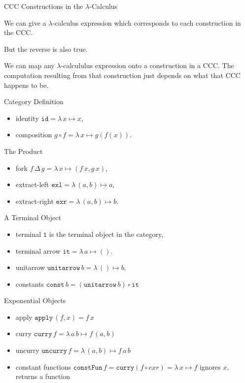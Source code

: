\documentclass[10pt]{beamer}
\newcommand{\id}{\mathtt{id}}
\newcommand{\apply}{\mathtt{apply}}
\newcommand{\curry}{\mathtt{curry}}
\newcommand{\uncurry}{\mathtt{uncurry}}
\newcommand{\exl}{\mathtt{exl}}
\newcommand{\exr}{\mathtt{exr}}
\newcommand{\termin}{\mathtt{1}}
\newcommand{\termarr}{\mathtt{it}}
\newcommand{\unitarrow}{\ensuremath{\mathtt{unitarrow}}}
\newcommand{\lamf}[2]{\ensuremath{\lambda\, #1 \mapsto #2}}
\newcommand{\delprod}[2]{\ensuremath{#1\,\Delta\,#2}}
\newcommand{\const}{\ensuremath{\mathtt{const}}}
\newcommand{\constFun}{\ensuremath{\mathtt{constFun}}}
\theoremstyle{definition}
\theoremstyle{remark}
\numberwithin{equation}{section}
\begin{document}
\begin{frame}[fragile]{CCC Constructions in the $\lambda$-Calculus}

  We can give a $\lambda$-calculus expression which corresponds to each construction in the CCC.

  But the reverse is also true.

  We can map any $\lambda$-calcululus expression onto a construction in a CCC. The computation resulting from that construction just depends on what that CCC happens to be.
  
\end{frame}

\begin{frame}[fragile]{Category Definition}
  \begin{itemize}
  \item identity $\id = \lamf{x}{x} $,
  \item composition $g \circ f = \lamf{x}{g(f(x))}$.
  \end{itemize}
\end{frame}

\begin{frame}[fragile]{The Product}
  \begin{itemize}
  \item fork $\delprod{f}{g} = \lamf{x}{(f\,x,g\,x)}$,
  \item extract-left $\exl = \lamf{(a,b)}{a}$,
  \item extract-right $\exr = \lamf{(a,b)}{b}$.
  \end{itemize}
\end{frame}

\begin{frame}[fragile]{A Terminal Object}
  \begin{itemize}
  \item terminal $\termin$ is the terminal object in the category,
  \item terminal arrow $\termarr = \lamf{a}{()}$.
  \item unitarrow $\unitarrow\, b = \lamf{()}{b}$.
  \item constants $\const\, b = (\unitarrow\, b) \circ \termarr$
  \end{itemize}
\end{frame}

\begin{frame}[fragile]{Exponential Objects}
  \begin{itemize}
  \item apply $\apply\, (f,x) = f\,x$
  \item curry $\curry\, f = \lamf{a\,b}{f\,(a,b)}$
  \item uncurry $\uncurry\, f = \lamf{(a,b)}{f\,a\,b}$
  \item constant functions $\constFun\, f = \curry (f \circ exr) = \lamf{x}{f}$ ignores $x$, returns a function
  \end{itemize}
\end{frame}
\end{document}
